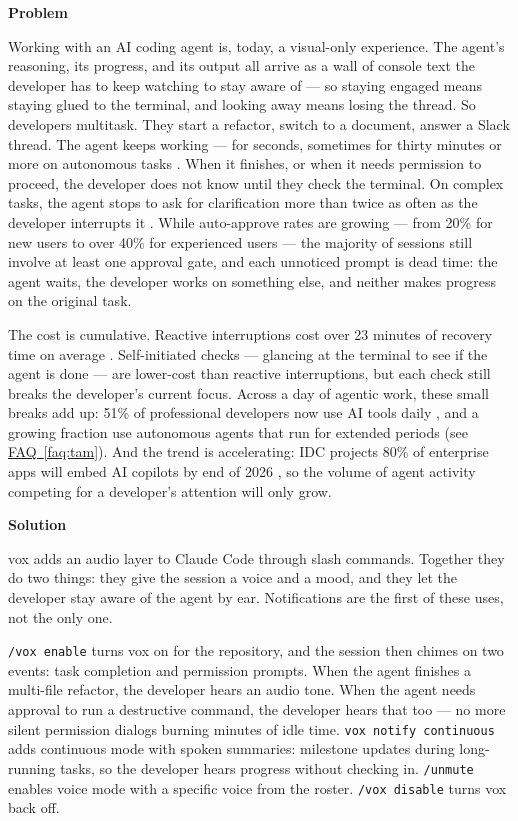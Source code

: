 \documentclass[11pt,letterpaper]{article}
\newcommand{\prsection}[1]{%
  \vspace{1em}%
  {\large\bfseries\color{SectionBlue}#1}%
  \vspace{0.3em}\par%
}
\newcommand{\faqref}[1]{\hyperref[#1]{FAQ~\ref*{#1}}}
\begin{document}
\prsection{Problem}

Working with an AI coding agent is, today, a visual-only experience. The
agent's reasoning, its progress, and its output all arrive as a wall of console
text the developer has to keep watching to stay aware of --- so staying engaged
means staying glued to the terminal, and looking away means losing the thread.
So developers multitask. They start a refactor, switch to a document, answer a
Slack thread. The agent keeps working --- for seconds, sometimes for thirty
minutes or more on autonomous tasks \cite{anthropic2026longrunnagents}. When it finishes, or when it needs
permission to proceed, the developer does not know until they check the
terminal. On complex tasks, the agent stops to ask for clarification more than
twice as often as the developer interrupts it
\cite{anthropic2026agentautonomy}. While auto-approve rates are growing ---
from 20\% for new users to over 40\% for experienced users --- the majority
of sessions still involve at least one approval gate, and each unnoticed
prompt is dead time: the agent waits, the developer works on something else,
and neither makes progress on the original task.

The cost is cumulative. Reactive interruptions cost over 23 minutes of
recovery time on average \cite{mark2008interrupted}. Self-initiated checks
--- glancing at the terminal to see if the agent is done --- are lower-cost
than reactive interruptions, but each check still breaks the developer's
current focus. Across a day of agentic work, these small breaks add up:
51\% of professional developers now use AI tools daily
\cite{stackoverflow2025survey}, and a growing fraction use autonomous agents
that run for extended periods
(see \faqref{faq:tam}). And the trend is accelerating: IDC projects 80\% of
enterprise apps will embed AI copilots by end of 2026
\cite{couriernotificationfatigue2026}, so the volume of agent activity
competing for a developer's attention will only grow.

\prsection{Solution}

vox adds an audio layer to Claude Code through slash commands. Together
they do two things: they give the session a voice and a mood, and they let the
developer stay aware of the agent by ear. Notifications are the first of these
uses, not the only one.

\texttt{/vox enable} turns vox on for the repository, and the session then chimes
on two events: task completion and permission prompts. When the agent finishes
a multi-file refactor, the developer hears an audio tone. When the agent needs
approval to run a destructive command, the developer hears that too --- no more
silent permission dialogs burning minutes of idle time. \texttt{vox notify
continuous} adds continuous mode with spoken summaries: milestone updates
during long-running tasks, so the developer hears progress without checking in.
\texttt{/unmute} enables voice mode with a specific voice from the roster.
\texttt{/vox disable} turns vox back off.
\end{document}

